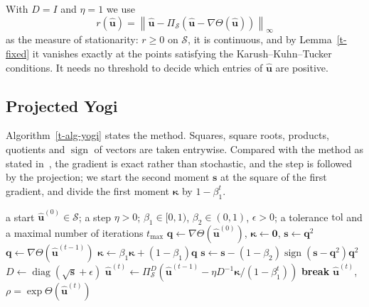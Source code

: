 \documentclass[11pt]{article}
\theoremstyle{plain}
\theoremstyle{definition}
\theoremstyle{remark}
\numberwithin{equation}{section}
\numberwithin{figure}{section}
\numberwithin{table}{section}
\begin{document}
With $D=I$ and $\eta=1$ we use
\begin{equation}\label{t-r}
r\left(\widehat{\bm u}\right)=\left\|\widehat{\bm u}-\Pi_{\mathcal{S}}\left(\widehat{\bm u}-\nabla\Theta\left(\widehat{\bm u}\right)\right)\right\|_\infty
\end{equation}
as the measure of stationarity: $r\ge 0$ on $\mathcal{S}$, it is continuous,
and by Lemma~\ref{t-fixed} it vanishes exactly at the points satisfying the
Karush--Kuhn--Tucker conditions. It needs no threshold to decide which entries
of $\widehat{\bm u}$ are positive.

\subsection{Projected Yogi}\label{sec-yogi}

Algorithm~\ref{t-alg-yogi} states the method. Squares, square roots, products,
quotients and $\operatorname{sign}$ of vectors are taken entrywise. Compared
with the method as stated in~\cite{2018Zaheer_Yogi}, the gradient is exact
rather than stochastic, and the step is followed by the projection; we start
the second moment $\bm s$ at the square of the first gradient, and divide the
first moment $\bm\kappa$ by $1-\beta_1^t$.

\begin{algorithm}[ht]
\caption{Projected Yogi}\label{t-alg-yogi}
\begin{algorithmic}[1]
\Require a start $\widehat{\bm u}^{(0)}\in\mathcal{S}$; a step $\eta>0$;
$\beta_1\in[0,1)$, $\beta_2\in(0,1)$, $\epsilon>0$; a tolerance $\mathrm{tol}$
and a maximal number of iterations $t_{\max}$
\State $\bm q\gets\nabla\Theta\left(\widehat{\bm u}^{(0)}\right)$, $\bm\kappa\gets\bm 0$, $\bm s\gets\bm q^2$
  \State $\bm q\gets\nabla\Theta\left(\widehat{\bm u}^{(t-1)}\right)$
  \State $\bm\kappa\gets\beta_1\bm\kappa+(1-\beta_1)\bm q$
  \State $\bm s\gets\bm s-(1-\beta_2)\operatorname{sign}\left(\bm s-\bm q^2\right)\bm q^2$
  \State $D\gets\operatorname{diag}\left(\sqrt{\bm s}+\epsilon\right)$
  \State $\widehat{\bm u}^{(t)}\gets\Pi^D_{\mathcal{S}}\left(\widehat{\bm u}^{(t-1)}-\eta D^{-1}\bm\kappa/\left(1-\beta_1^t\right)\right)$
    \State \textbf{break}
  \EndIf
\EndFor
\State \Return $\widehat{\bm u}^{(t)}$, $\rho=\exp\Theta\left(\widehat{\bm u}^{(t)}\right)$
\end{algorithmic}
\end{algorithm}
\end{document}
